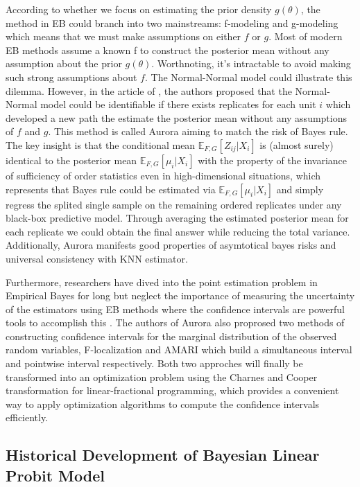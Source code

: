 \documentclass{article}
\begin{document}
According to whether we focus on estimating the prior density $g(\theta)$, the method in EB could branch into two mainstreams: f-modeling and g-modeling which means that we must make assumptions on either $f$ or $g$. Most of modern EB methods assume a known f to construct the posterior mean without any assumption about the prior $g(\theta)$. Worthnoting, it's intractable to avoid making such strong assumptions about $f$. The Normal-Normal model could illustrate this dilemma. However, in the article of \cite{Order}, the authors proposed that the Normal-Normal model could be identifiable if there exists replicates for each unit $i$ which developed a new path the estimate the posterior mean without any assumptions of $f$ and $g$. This method is called Aurora aiming to match the risk of Bayes rule. The key insight is that the conditional mean $\mathbb{E}_{F,G}[Z_{ij}|X_i]$  is (almost surely) identical to the posterior mean $\mathbb{E}_{F,G}[\mu_i|X_i]$ with the property of the invariance of sufficiency of order statistics even in high-dimensional situations, which represents that Bayes rule could be estimated via $\mathbb{E}_{F,G}[\mu_i|X_i]$ and simply regress the splited single sample on the remaining ordered replicates under any black-box predictive model. Through averaging the estimated posterior mean for each replicate we could obtain the final answer while reducing the total variance. Additionally, Aurora manifests good properties of asymtotical bayes risks and universal consistency with KNN estimator. 

Furthermore, researchers have dived into the point estimation problem in Empirical Bayes for long but neglect the importance of measuring the uncertainty of the estimators using EB methods where the confidence intervals are powerful tools to accomplish this \cite{CINEBA}. The authors of Aurora also proprosed two methods of constructing confidence intervals for the marginal distribution of the observed random variables, F-localization and AMARI which build a simultaneous interval and pointwise interval respectively. Both two approches will finally be transformed into an optimization problem using the Charnes and Cooper transformation for linear-fractional programming, which provides a convenient way to apply optimization algorithms to compute the confidence intervals efficiently.  


\subsection{Historical Development of Bayesian Linear Probit Model}
\end{document}
